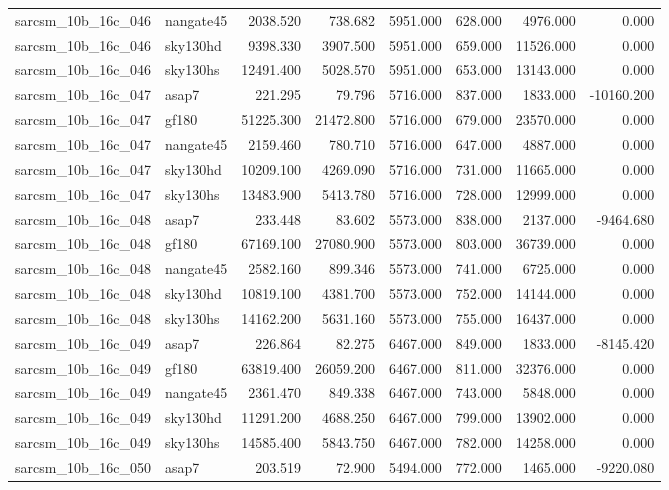 \begin{tabular}{llrrrrrr}
sarcsm\_10b\_16c\_046 & nangate45 & 2038.520 & 738.682 & 5951.000 & 628.000 & 4976.000 & 0.000 \\
sarcsm\_10b\_16c\_046 & sky130hd & 9398.330 & 3907.500 & 5951.000 & 659.000 & 11526.000 & 0.000 \\
sarcsm\_10b\_16c\_046 & sky130hs & 12491.400 & 5028.570 & 5951.000 & 653.000 & 13143.000 & 0.000 \\
sarcsm\_10b\_16c\_047 & asap7 & 221.295 & 79.796 & 5716.000 & 837.000 & 1833.000 & -10160.200 \\
sarcsm\_10b\_16c\_047 & gf180 & 51225.300 & 21472.800 & 5716.000 & 679.000 & 23570.000 & 0.000 \\
sarcsm\_10b\_16c\_047 & nangate45 & 2159.460 & 780.710 & 5716.000 & 647.000 & 4887.000 & 0.000 \\
sarcsm\_10b\_16c\_047 & sky130hd & 10209.100 & 4269.090 & 5716.000 & 731.000 & 11665.000 & 0.000 \\
sarcsm\_10b\_16c\_047 & sky130hs & 13483.900 & 5413.780 & 5716.000 & 728.000 & 12999.000 & 0.000 \\
sarcsm\_10b\_16c\_048 & asap7 & 233.448 & 83.602 & 5573.000 & 838.000 & 2137.000 & -9464.680 \\
sarcsm\_10b\_16c\_048 & gf180 & 67169.100 & 27080.900 & 5573.000 & 803.000 & 36739.000 & 0.000 \\
sarcsm\_10b\_16c\_048 & nangate45 & 2582.160 & 899.346 & 5573.000 & 741.000 & 6725.000 & 0.000 \\
sarcsm\_10b\_16c\_048 & sky130hd & 10819.100 & 4381.700 & 5573.000 & 752.000 & 14144.000 & 0.000 \\
sarcsm\_10b\_16c\_048 & sky130hs & 14162.200 & 5631.160 & 5573.000 & 755.000 & 16437.000 & 0.000 \\
sarcsm\_10b\_16c\_049 & asap7 & 226.864 & 82.275 & 6467.000 & 849.000 & 1833.000 & -8145.420 \\
sarcsm\_10b\_16c\_049 & gf180 & 63819.400 & 26059.200 & 6467.000 & 811.000 & 32376.000 & 0.000 \\
sarcsm\_10b\_16c\_049 & nangate45 & 2361.470 & 849.338 & 6467.000 & 743.000 & 5848.000 & 0.000 \\
sarcsm\_10b\_16c\_049 & sky130hd & 11291.200 & 4688.250 & 6467.000 & 799.000 & 13902.000 & 0.000 \\
sarcsm\_10b\_16c\_049 & sky130hs & 14585.400 & 5843.750 & 6467.000 & 782.000 & 14258.000 & 0.000 \\
sarcsm\_10b\_16c\_050 & asap7 & 203.519 & 72.900 & 5494.000 & 772.000 & 1465.000 & -9220.080 \\

\end{tabular}
